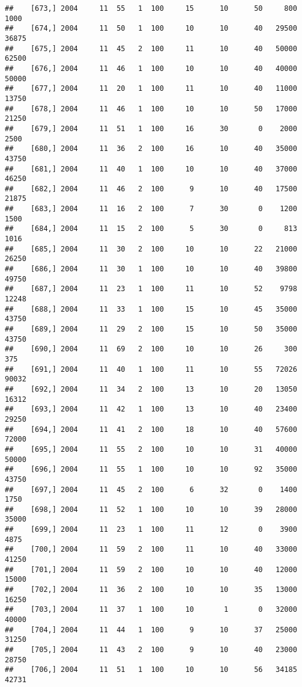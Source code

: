 \documentclass{article}\usepackage[]{graphicx}\usepackage[]{color}
\makeatletter
\newenvironment{kframe}{%
 \def\at@end@of@kframe{}%
 \ifinner\ifhmode%
  \def\at@end@of@kframe{\end{minipage}}%
  \begin{minipage}{\columnwidth}%
 \fi\fi%
 \def\FrameCommand##1{\hskip\@totalleftmargin \hskip-\fboxsep
 \colorbox{shadecolor}{##1}\hskip-\fboxsep
     \hskip-\linewidth \hskip-\@totalleftmargin \hskip\columnwidth}%
 \MakeFramed {\advance\hsize-\width
   \@totalleftmargin\z@ \linewidth\hsize
   \@setminipage}}%
 {\par\unskip\endMakeFramed%
 \at@end@of@kframe}
\newenvironment{knitrout}{}{} %
\makeatother
\begin{document}
\begin{knitrout}
\begin{kframe}
\begin{verbatim}
##    [673,] 2004     11  55   1  100     15      10      50     800    1000
##    [674,] 2004     11  50   1  100     10      10      40   29500   36875
##    [675,] 2004     11  45   2  100     11      10      40   50000   62500
##    [676,] 2004     11  46   1  100     10      10      40   40000   50000
##    [677,] 2004     11  20   1  100     11      10      40   11000   13750
##    [678,] 2004     11  46   1  100     10      10      50   17000   21250
##    [679,] 2004     11  51   1  100     16      30       0    2000    2500
##    [680,] 2004     11  36   2  100     16      10      40   35000   43750
##    [681,] 2004     11  40   1  100     10      10      40   37000   46250
##    [682,] 2004     11  46   2  100      9      10      40   17500   21875
##    [683,] 2004     11  16   2  100      7      30       0    1200    1500
##    [684,] 2004     11  15   2  100      5      30       0     813    1016
##    [685,] 2004     11  30   2  100     10      10      22   21000   26250
##    [686,] 2004     11  30   1  100     10      10      40   39800   49750
##    [687,] 2004     11  23   1  100     11      10      52    9798   12248
##    [688,] 2004     11  33   1  100     15      10      45   35000   43750
##    [689,] 2004     11  29   2  100     15      10      50   35000   43750
##    [690,] 2004     11  69   2  100     10      10      26     300     375
##    [691,] 2004     11  40   1  100     11      10      55   72026   90032
##    [692,] 2004     11  34   2  100     13      10      20   13050   16312
##    [693,] 2004     11  42   1  100     13      10      40   23400   29250
##    [694,] 2004     11  41   2  100     18      10      40   57600   72000
##    [695,] 2004     11  55   2  100     10      10      31   40000   50000
##    [696,] 2004     11  55   1  100     10      10      92   35000   43750
##    [697,] 2004     11  45   2  100      6      32       0    1400    1750
##    [698,] 2004     11  52   1  100     10      10      39   28000   35000
##    [699,] 2004     11  23   1  100     11      12       0    3900    4875
##    [700,] 2004     11  59   2  100     11      10      40   33000   41250
##    [701,] 2004     11  59   2  100     10      10      40   12000   15000
##    [702,] 2004     11  36   2  100     10      10      35   13000   16250
##    [703,] 2004     11  37   1  100     10       1       0   32000   40000
##    [704,] 2004     11  44   1  100      9      10      37   25000   31250
##    [705,] 2004     11  43   2  100      9      10      40   23000   28750
##    [706,] 2004     11  51   1  100     10      10      56   34185   42731

\end{verbatim}
\end{kframe}
\end{knitrout}
\end{document}

